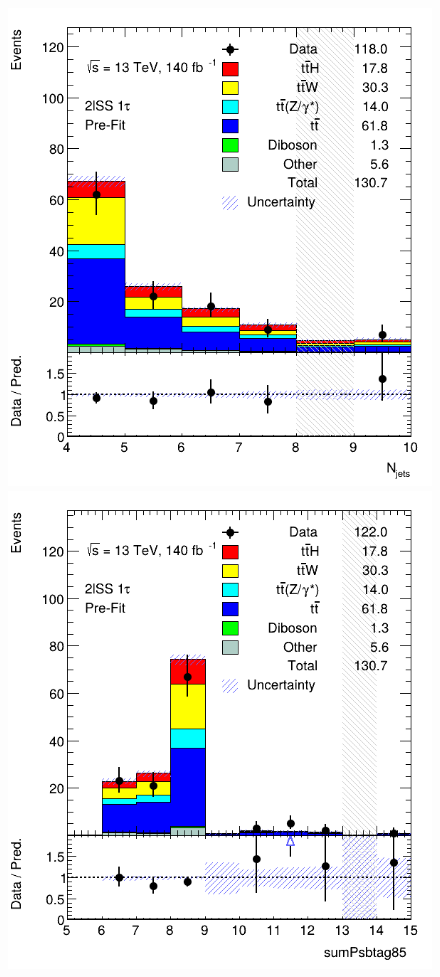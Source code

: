 \begin{figure}[ht!]
    \includegraphics[scale=0.25]{res/AnalysisPlots/wData/n-jets.png}
    \includegraphics[scale=0.25]{res/AnalysisPlots/wData/n-bjets.png}

\end{figure}
